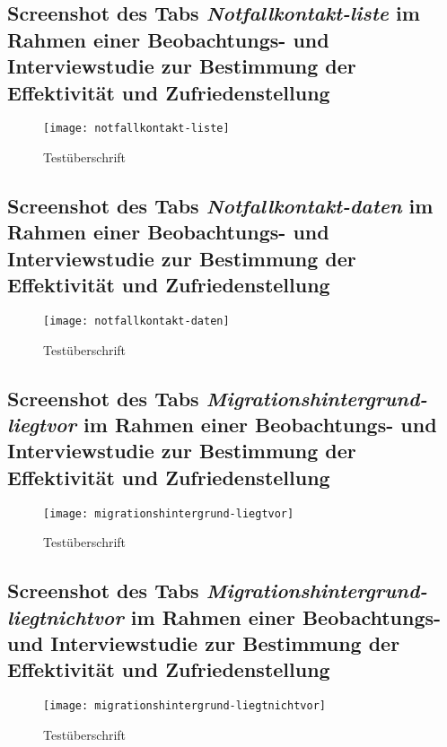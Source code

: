\begin{landscape}
    \subsection{Screenshot des Tabs \textit{Notfallkontakt-liste} im Rahmen einer Beobachtungs- und Interviewstudie zur Bestimmung der Effektivität und Zufriedenstellung}
    \label{section-notfallkontakt-liste}
    \begin{figure}[H]
        \centering
        \caption{Testüberschrift}
        \begin{adjustbox}{width=\linewidth, center}
            \texttt{[image: notfallkontakt-liste]}
        \end{adjustbox}
    \end{figure}

    \subsection{Screenshot des Tabs \textit{Notfallkontakt-daten} im Rahmen einer Beobachtungs- und Interviewstudie zur Bestimmung der Effektivität und Zufriedenstellung}
    \label{section-notfallkontakt-daten}
    \begin{figure}[H]
        \centering
        \caption{Testüberschrift}
        \begin{adjustbox}{width=0.6\linewidth, center}
            \texttt{[image: notfallkontakt-daten]}
        \end{adjustbox}
    \end{figure}

    \subsection{Screenshot des Tabs \textit{Migrationshintergrund-liegtvor} im Rahmen einer Beobachtungs- und Interviewstudie zur Bestimmung der Effektivität und Zufriedenstellung}
    \label{section-migrationshintergrund-liegtvor}
    \begin{figure}[H]
        \centering
        \caption{Testüberschrift}
        \begin{adjustbox}{width=\linewidth, center}
            \texttt{[image: migrationshintergrund-liegtvor]}
        \end{adjustbox}
    \end{figure}

    \subsection{Screenshot des Tabs \textit{Migrationshintergrund-liegtnichtvor} im Rahmen einer Beobachtungs- und Interviewstudie zur Bestimmung der Effektivität und Zufriedenstellung}
    \label{section-migrationshintergrund-liegtnichtvor}
    \begin{figure}[H]
        \centering
        \caption{Testüberschrift}
        \begin{adjustbox}{width=\linewidth, center}
            \texttt{[image: migrationshintergrund-liegtnichtvor]}
        \end{adjustbox}
    \end{figure}


\end{landscape}
